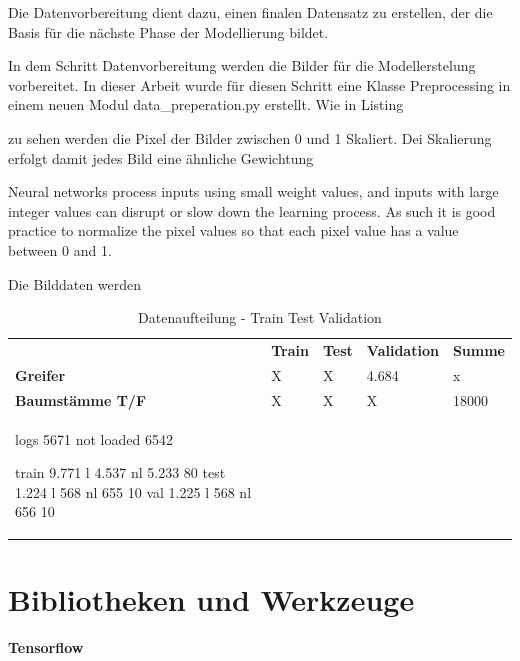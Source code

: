 Die Datenvorbereitung dient dazu, einen finalen Datensatz zu erstellen, der die Basis für die nächste Phase der Modellierung bildet.


			In dem Schritt Datenvorbereitung werden die Bilder für die Modellerstelung vorbereitet. In dieser Arbeit wurde für diesen Schritt eine Klasse Preprocessing in einem neuen Modul data\_preperation.py  erstellt. Wie in Listing 
			
			 zu sehen werden die Pixel der Bilder zwischen 0 und 1 Skaliert. Dei Skalierung erfolgt damit jedes Bild eine ähnliche Gewichtung
			
			Neural networks process inputs using small weight values, and inputs with large integer values can disrupt or slow down the learning process. As such it is good practice to normalize the pixel values so that each pixel value has a value between 0 and 1.
			
			Die Bilddaten werden 		
			

 

	\begin{table}[ht]
	\centering
	\begin{tabularx}{\textwidth}{lllll}
		 & \textbf{Train} & \textbf{Test}  & \textbf{Validation} & \textbf{Summe} 								  \\
		\textbf{Greifer} 				 & 	X					&	X					& 4.684 				   & x 				\\
		\textbf{Baumstämme T/F}	 	  &  X					 &	X					 &	X							& 18000		\\
		
		
		logs 5671
		not loaded 6542 
		 
		train 9.771 l 4.537  nl 5.233 80
		test 1.224 l  568 nl 655  10
		val  1.225 l 568 nl 656  10
		
	\end{tabularx}
	\caption{Datenaufteilung - Train Test Validation}
	\label{table:DatenaufteilungTrainTestValidation}
 	\end{table}
 
	\section{Bibliotheken und Werkzeuge}
	\label{sec:BibliothekenundWerkzeuge}
		\paragraph{Tensorflow}
